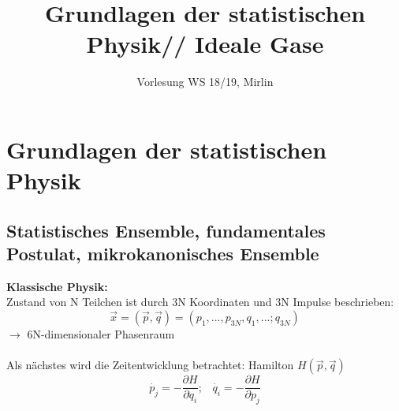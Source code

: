 \documentclass[a4paper,11pt]{scrartcl}
\begin{document}
\begin{titlepage}


\title{Grundlagen der statistischen Physik// Ideale Gase}

\date{Vorlesung WS 18/19, Mirlin}

\vfill
\maketitle
\end{titlepage}
\newpage
\tableofcontents
\newpage
\section{Grundlagen der statistischen Physik}
\subsection{Statistisches Ensemble, fundamentales Postulat, mikrokanonisches Ensemble}
\textbf{Klassische Physik:}\\
Zustand von N Teilchen ist durch 3N Koordinaten und 3N Impulse beschrieben:
\begin{equation}
 \vec{x} = ( \vec{p}, \vec{q}) = (p_1,..., p_{3N}, q_1,...; q_{3N})
\end{equation}
$ \rightarrow$ 6N-dimensionaler Phasenraum\\
\\
Als nächstes wird die Zeitentwicklung betrachtet: Hamilton $H(\vec{p}, \vec{q})$\\
\begin{equation}
 \dot{p_j} = - \frac{\partial H}{\partial q_i}; \,\,\,\,\, \dot{q_i} = - \frac{\partial H}{\partial p_j}
\end{equation}
\end{document}
